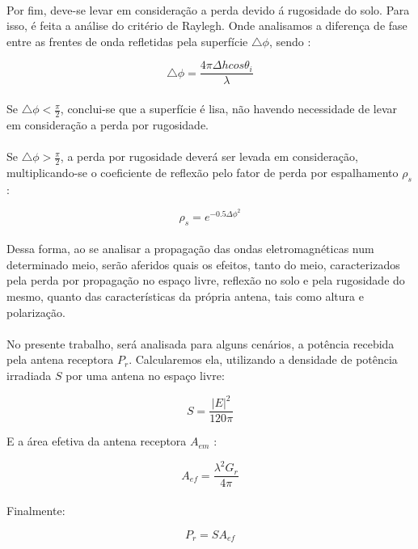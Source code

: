 \paragraph{}Por fim, deve-se levar em consideração a perda devido á rugosidade do solo. Para isso, é feita a análise do critério de Raylegh. Onde analisamos a diferença de fase entre as frentes de onda refletidas pela superfície $\triangle\phi$, sendo \citep{Andrezo}:

\begin{equation}
    \triangle\phi = \frac{4\pi\Delta hcos\theta_i}{\lambda}
\end{equation}

\paragraph{}Se $\triangle\phi < \frac{\pi}{2}$, conclui-se que a superfície é lisa, não havendo necessidade de levar em consideração a perda por rugosidade.

\paragraph{}Se $\triangle\phi > \frac{\pi}{2}$, a perda por rugosidade deverá ser levada em consideração, multiplicando-se o coeficiente de reflexão pelo fator de perda por espalhamento $\rho_s$:

\begin{equation}
    \rho_s = e^{-0.5{\Delta \phi}^2}
\end{equation}

\paragraph{}Dessa forma, ao se analisar a propagação das ondas eletromagnéticas num determinado meio, serão aferidos quais os efeitos, tanto do meio, caracterizados pela perda por propagação no espaço livre, reflexão no solo e pela rugosidade do mesmo, quanto das características da própria antena, tais como altura e polarização.

\paragraph{}No presente trabalho, será analisada para alguns cenários, a potência recebida pela antena receptora $P_r$. Calcularemos ela, utilizando a densidade de potência irradiada $S$ por uma antena no espaço livre:

\begin{equation}
    S = \frac{|E|^2}{120\pi}
\end{equation}

E a área efetiva da antena receptora $A_{em}$ \cite{balanis}:

\begin{equation}
    A_{ef} = \frac{\lambda^2G_r}{4\pi}
\end{equation}

\paragraph{}Finalmente:

\begin{equation}
    P_r = SA_{ef}
\end{equation}
